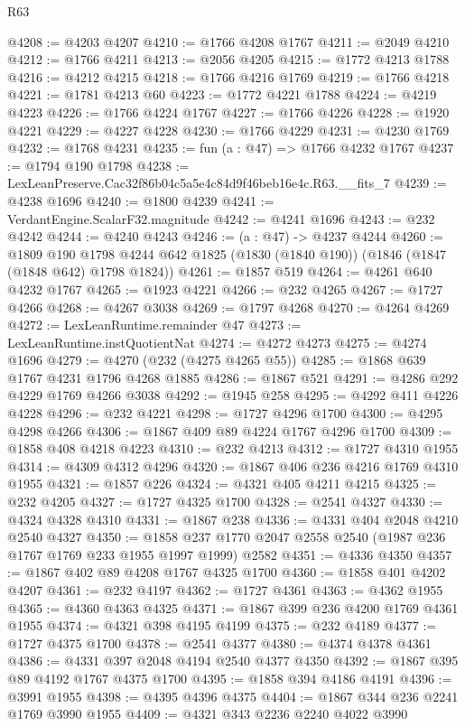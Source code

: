 \begin{lexlean}{R63}
\begin{coremodule}
@4208 := @4203 @4207
@4210 := @1766 @4208 @1767
@4211 := @2049 @4210
@4212 := @1766 @4211
@4213 := @2056 @4205
@4215 := @1772 @4213 @1788
@4216 := @4212 @4215
@4218 := @1766 @4216 @1769
@4219 := @1766 @4218
@4221 := @1781 @4213 @60
@4223 := @1772 @4221 @1788
@4224 := @4219 @4223
@4226 := @1766 @4224 @1767
@4227 := @1766 @4226
@4228 := @1920 @4221
@4229 := @4227 @4228
@4230 := @1766 @4229
@4231 := @4230 @1769
@4232 := @1768 @4231
@4235 := fun (a : @47) => @1766 @4232 @1767
@4237 := @1794 @190 @1798
@4238 := LexLeanPreserve.Cac32f86b04c5a5e4c84d9f46beb16e4c.R63.__fits_7
@4239 := @4238 @1696
@4240 := @1800 @4239
@4241 := VerdantEngine.ScalarF32.magnitude
@4242 := @4241 @1696
@4243 := @232 @4242
@4244 := @4240 @4243
@4246 := (a : @47) -> @4237 @4244
@4260 := @1809
    @190
    @1798
    @4244
    @642
    @1825
    (@1830 (@1840 @190))
    (@1846 (@1847 (@1848 @642) @1798 @1824))
@4261 := @1857 @519
@4264 := @4261 @640 @4232 @1767
@4265 := @1923 @4221
@4266 := @232 @4265
@4267 := @1727 @4266
@4268 := @4267 @3038
@4269 := @1797 @4268
@4270 := @4264 @4269
@4272 := LexLeanRuntime.remainder @47
@4273 := LexLeanRuntime.instQuotientNat
@4274 := @4272 @4273
@4275 := @4274 @1696
@4279 := @4270 (@232 (@4275 @4265 @55))
@4285 := @1868 @639 @1767 @4231 @1796 @4268 @1885
@4286 := @1867 @521
@4291 := @4286 @292 @4229 @1769 @4266 @3038
@4292 := @1945 @258
@4295 := @4292 @411 @4226 @4228
@4296 := @232 @4221
@4298 := @1727 @4296 @1700
@4300 := @4295 @4298 @4266
@4306 := @1867 @409 @89 @4224 @1767 @4296 @1700
@4309 := @1858 @408 @4218 @4223
@4310 := @232 @4213
@4312 := @1727 @4310 @1955
@4314 := @4309 @4312 @4296
@4320 := @1867 @406 @236 @4216 @1769 @4310 @1955
@4321 := @1857 @226
@4324 := @4321 @405 @4211 @4215
@4325 := @232 @4205
@4327 := @1727 @4325 @1700
@4328 := @2541 @4327
@4330 := @4324 @4328 @4310
@4331 := @1867 @238
@4336 := @4331 @404 @2048 @4210 @2540 @4327
@4350 := @1858 @237 @1770 @2047 @2558 @2540 (@1987 @236 @1767 @1769 @233 @1955 @1997 @1999) @2582
@4351 := @4336 @4350
@4357 := @1867 @402 @89 @4208 @1767 @4325 @1700
@4360 := @1858 @401 @4202 @4207
@4361 := @232 @4197
@4362 := @1727 @4361
@4363 := @4362 @1955
@4365 := @4360 @4363 @4325
@4371 := @1867 @399 @236 @4200 @1769 @4361 @1955
@4374 := @4321 @398 @4195 @4199
@4375 := @232 @4189
@4377 := @1727 @4375 @1700
@4378 := @2541 @4377
@4380 := @4374 @4378 @4361
@4386 := @4331 @397 @2048 @4194 @2540 @4377 @4350
@4392 := @1867 @395 @89 @4192 @1767 @4375 @1700
@4395 := @1858 @394 @4186 @4191
@4396 := @3991 @1955
@4398 := @4395 @4396 @4375
@4404 := @1867 @344 @236 @2241 @1769 @3990 @1955
@4409 := @4321 @343 @2236 @2240 @4022 @3990

\end{coremodule}
\end{lexlean}
